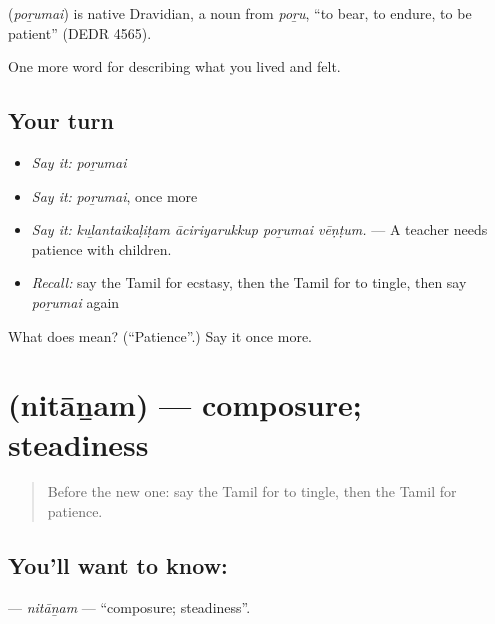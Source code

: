 \begin{cousinweb}
\textbf{} (\emph{poṟumai}) is native Dravidian, a noun from  \emph{poṟu}, \textquotedblleft{}to bear, to endure, to be patient\textquotedblright{} (DEDR 4565).
\end{cousinweb}

\begin{grammarlens}[title={What you've built}]
One more word for describing what you lived and felt.
\end{grammarlens}

\subsection*{Your turn}
\begin{itemize}
\raggedright
  \item \emph{Say it:} \emph{poṟumai}
  \item \emph{Say it:} \emph{poṟumai}, once more
  \item \emph{Say it:} \emph{kuḻantaikaḷiṭam āciriyarukkup poṟumai vēṇṭum.} — A teacher needs patience with children.
  \item \emph{Recall:} say the Tamil for ecstasy, then the Tamil for to tingle, then say \emph{poṟumai} again
\end{itemize}

\begin{tcolorbox}[breakable,colback=teal!4,colframe=teal!35!black,title={Before you move on}]
What does  mean? (\textquotedblleft{}Patience\textquotedblright{}.) Say it once more.
\end{tcolorbox}
\section[\texorpdfstring{\ta{நிதானம்} (nitāṉam)}{நிதானம் (nitāṉam)}]{ (nitāṉam) — composure; steadiness}

\label{lesson:TA-C461-nitanam}



\begin{quote}
Before the new one: say the Tamil for to tingle, then the Tamil for patience.
\end{quote}

\subsection*{You'll want to know: }
\textbf{} — \emph{nitāṉam} — \textquotedblleft{}composure; steadiness\textquotedblright{}.

